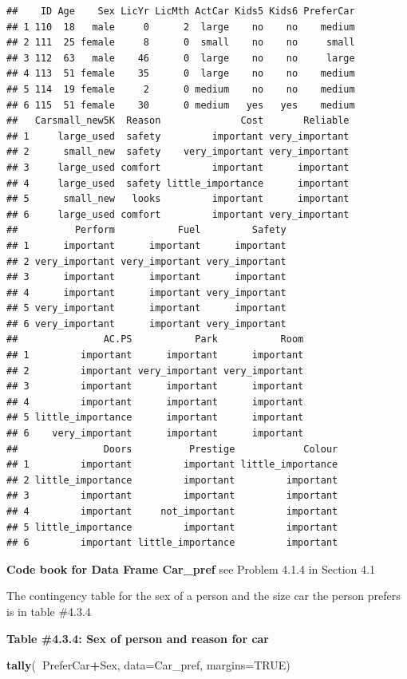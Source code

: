 \documentclass[
]{book}
\newenvironment{Shaded}{\begin{snugshade}}{\end{snugshade}}
\newcommand{\DataTypeTok}[1]{\textcolor[rgb]{0.13,0.29,0.53}{#1}}
\newcommand{\KeywordTok}[1]{\textcolor[rgb]{0.13,0.29,0.53}{\textbf{#1}}}
\newcommand{\NormalTok}[1]{#1}
\newcommand{\OperatorTok}[1]{\textcolor[rgb]{0.81,0.36,0.00}{\textbf{#1}}}
\newcommand{\OtherTok}[1]{\textcolor[rgb]{0.56,0.35,0.01}{#1}}
\begin{document}
\begin{verbatim}
##    ID Age    Sex LicYr LicMth ActCar Kids5 Kids6 PreferCar
## 1 110  18   male     0      2  large    no    no    medium
## 2 111  25 female     8      0  small    no    no     small
## 3 112  63   male    46      0  large    no    no     large
## 4 113  51 female    35      0  large    no    no    medium
## 5 114  19 female     2      0 medium    no    no    medium
## 6 115  51 female    30      0 medium   yes   yes    medium
##   Carsmall_new5K  Reason              Cost       Reliable
## 1     large_used  safety         important very_important
## 2      small_new  safety    very_important very_important
## 3     large_used comfort         important      important
## 4     large_used  safety little_importance      important
## 5      small_new   looks         important      important
## 6     large_used comfort         important very_important
##          Perform           Fuel         Safety
## 1      important      important      important
## 2 very_important very_important very_important
## 3      important      important      important
## 4      important      important very_important
## 5 very_important      important      important
## 6 very_important      important very_important
##               AC.PS           Park           Room
## 1         important      important      important
## 2         important very_important very_important
## 3         important      important      important
## 4         important      important      important
## 5 little_importance      important      important
## 6    very_important      important      important
##               Doors          Prestige            Colour
## 1         important         important little_importance
## 2 little_importance         important         important
## 3         important         important         important
## 4         important     not_important         important
## 5 little_importance         important         important
## 6         important little_importance         important
\end{verbatim}

\textbf{Code book for Data Frame Car\_pref} see Problem 4.1.4 in Section 4.1

The contingency table for the sex of a person and the size car the person prefers is in table \#4.3.4

\textbf{Table \#4.3.4: Sex of person and reason for car}

\begin{Shaded}
\begin{Highlighting}[]
\KeywordTok{tally}\NormalTok{(}\OperatorTok{~}\NormalTok{PreferCar}\OperatorTok{+}\NormalTok{Sex, }\DataTypeTok{data=}\NormalTok{Car_pref, }\DataTypeTok{margins=}\OtherTok{TRUE}\NormalTok{)}
\end{Highlighting}
\end{Shaded}
\end{document}
